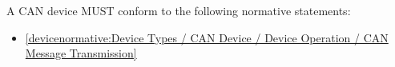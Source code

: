 \label{sec:Conformance / Device Conformance / CAN Device Conformance}

A CAN device MUST conform to the following normative statements:

\begin{itemize}
\item \ref{devicenormative:Device Types / CAN Device / Device Operation / CAN Message Transmission}
\end{itemize}
